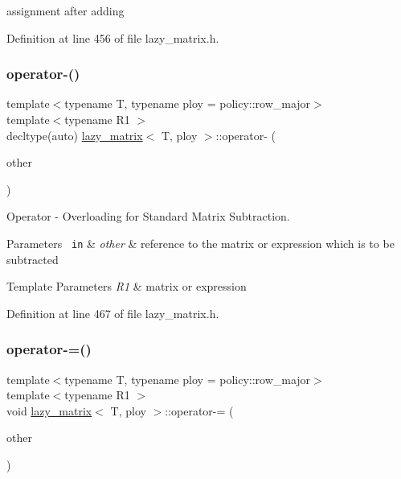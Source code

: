 assignment after adding 



Definition at line 456 of file lazy\+\_\+matrix.\+h.

\mbox{\label{classlazy__matrix_ac0e4bc6ef87afe7ef9b435f2f33878f3}} 
\subsubsection{\texorpdfstring{operator-\/()}{operator-()}}
{\footnotesize\ttfamily template$<$typename T, typename ploy = policy\+::row\+\_\+major$>$ \\
template$<$typename R1 $>$ \\
decltype(auto) \mbox{\hyperlink{classlazy__matrix}{lazy\+\_\+matrix}}$<$ T, ploy $>$\+::operator-\/ (\begin{DoxyParamCaption}\item[{const R1 \&}]{other }\end{DoxyParamCaption})\hspace{0.3cm}{\ttfamily [inline]}}



Operator -\/ Overloading for Standard Matrix Subtraction. 


\begin{DoxyParams}[1]{Parameters}
\mbox{\texttt{ in}}  & {\em other} & reference to the matrix or expression which is to be subtracted\\
\hline
\end{DoxyParams}

\begin{DoxyTemplParams}{Template Parameters}
{\em R1} & matrix or expression \\
\hline
\end{DoxyTemplParams}


Definition at line 467 of file lazy\+\_\+matrix.\+h.

\mbox{\label{classlazy__matrix_a1115dadbd778a1c2c7e8ad1d0c8a3fd1}} 
\subsubsection{\texorpdfstring{operator-\/=()}{operator-=()}}
{\footnotesize\ttfamily template$<$typename T, typename ploy = policy\+::row\+\_\+major$>$ \\
template$<$typename R1 $>$ \\
void \mbox{\hyperlink{classlazy__matrix}{lazy\+\_\+matrix}}$<$ T, ploy $>$\+::operator-\/= (\begin{DoxyParamCaption}\item[{const R1 \&}]{other }\end{DoxyParamCaption})\hspace{0.3cm}{\ttfamily [inline]}}



